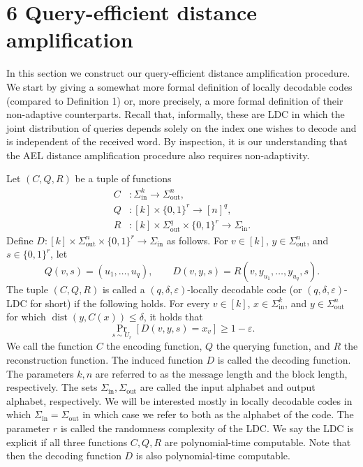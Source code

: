 \section*{6 Query-efficient distance amplification}
In this section we construct our query-efficient distance amplification procedure. We start by giving a somewhat more formal definition of locally decodable codes (compared to Definition 1) or, more precisely, a more formal definition of their non-adaptive counterparts. Recall that, informally, these are LDC in which the joint distribution of queries depends solely on the index one wishes to decode and is independent of the received word. By inspection, it is our understanding that the AEL distance amplification procedure also requires non-adaptivity.
\setcounter{nttheorem}{63}
\begin{ntdefinition}
Let $(C,Q,R)$ be a tuple of functions
\begin{align*}C&:\Sigma_{\mathrm{in}}^k\to\Sigma_{\mathrm{out}}^n,\\Q&:[k]\times\{0,1\}^r\to[n]^q,\\R&:[k]\times\Sigma_{\mathrm{out}}^q\times\{0,1\}^r\to\Sigma_{\mathrm{in}}.\end{align*}
Define $D:[k]\times\Sigma_{\mathrm{out}}^n\times\{0,1\}^r\to\Sigma_{\mathrm{in}}$ as follows. For $v\in[k]$, $y\in\Sigma_{\mathrm{out}}^n$, and $s\in\{0,1\}^r$, let
\[Q(v,s)=(u_1,\ldots,u_q),\qquad D(v,y,s)=R(v,y_{u_1},\ldots,y_{u_q},s).\]
The tuple $(C,Q,R)$ is called a $(q,\delta,\varepsilon)$-locally decodable code (or $(q,\delta,\varepsilon)$-LDC for short) if the following holds. For every $v\in[k]$, $x\in\Sigma_{\mathrm{in}}^k$, and $y\in\Sigma_{\mathrm{out}}^n$ for which $\operatorname{dist}(y,C(x))\leq\delta$, it holds that
\[\Pr_{s\sim U_r}[D(v,y,s)=x_v]\geq1-\varepsilon.\]
We call the function $C$ the encoding function, $Q$ the querying function, and $R$ the reconstruction function. The induced function $D$ is called the decoding function. The parameters $k,n$ are referred to as the message length and the block length, respectively. The sets $\Sigma_{\mathrm{in}},\Sigma_{\mathrm{out}}$ are called the input alphabet and output alphabet, respectively. We will be interested mostly in locally decodable codes in which $\Sigma_{\mathrm{in}}=\Sigma_{\mathrm{out}}$ in which case we refer to both as the alphabet of the code. The parameter $r$ is called the randomness complexity of the LDC. We say the LDC is explicit if all three functions $C,Q,R$ are polynomial-time computable. Note that then the decoding function $D$ is also polynomial-time computable.
\end{ntdefinition}
